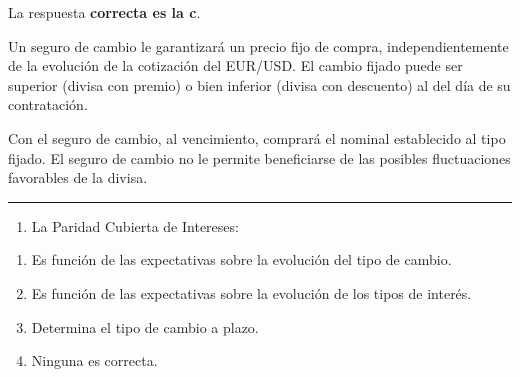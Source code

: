 \documentclass[
  letterpaper,
  DIV=11,
  numbers=noendperiod]{scrreprt}
\providecommand{\tightlist}{%
  \setlength{\itemsep}{0pt}\setlength{\parskip}{0pt}}\usepackage{longtable,booktabs,array}
\begin{document}
\begin{tcolorbox}[enhanced jigsaw, left=2mm, opacityback=0, colback=white, breakable, arc=.35mm, bottomrule=.15mm, rightrule=.15mm, toprule=.15mm, leftrule=.75mm, colframe=quarto-callout-tip-color-frame]
\begin{minipage}[t]{5.5mm}
\textcolor{quarto-callout-tip-color}{\faLightbulb}
\end{minipage}%
\begin{minipage}[t]{\textwidth - 5.5mm}

La respuesta \textbf{correcta es la c}.

Un seguro de cambio le garantizará un precio fijo de compra,
independientemente de la evolución de la cotización del EUR/USD. El
cambio fijado puede ser superior (divisa con premio) o bien inferior
(divisa con descuento) al del día de su contratación.

Con el seguro de cambio, al vencimiento, comprará el nominal establecido
al tipo fijado. El seguro de cambio no le permite beneficiarse de las
posibles fluctuaciones favorables de la divisa.

\end{minipage}%
\end{tcolorbox}

\begin{center}\rule{0.5\linewidth}{0.5pt}\end{center}

\begin{enumerate}
\def\labelenumi{\arabic{enumi}.}
\setcounter{enumi}{16}
\tightlist
\item
  La Paridad Cubierta de Intereses:
\end{enumerate}

\begin{enumerate}
\def\labelenumi{\alph{enumi})}
\item
  Es función de las expectativas sobre la evolución del tipo de cambio.
\item
  Es función de las expectativas sobre la evolución de los tipos de
  interés.
\item
  Determina el tipo de cambio a plazo.
\item
  Ninguna es correcta.
\end{enumerate}
\end{document}
